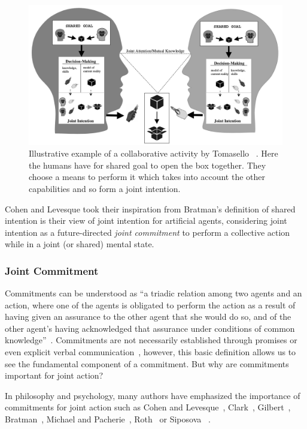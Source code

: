 \documentclass[a4paper,11pt,twoside]{StyleThese}
\begin{document}
 \begin{figure}[!ht]
 	\includegraphics[width=\linewidth]{figures/chapter1/shared_representation.png}
 	\caption{Illustrative example of a collaborative activity by Tomasello \etal~\cite{tomasello_2005_understanding}. Here the humans have for shared goal to open the box together. They choose a means to perform it which takes into account the other capabilities and so form a joint	intention.}
 	\label{chap1:fig:ji}
 \end{figure}

Cohen and Levesque took their inspiration from Bratman's definition of shared intention is their view of joint intention for artificial agents, considering joint intention as a future-directed \emph{joint commitment} to perform a collective action while in a joint (or shared) mental state.

\subsubsection{Joint Commitment}\label{chap1:subsubsec:joint_commit}
Commitments can be understood as ``a triadic relation among two agents and an action, where one of the agents is obligated to perform the action as a result of having given an assurance to the other agent that she would do so, and of the other agent’s having acknowledged that assurance under conditions of common knowledge''~\cite[p.~756]{michael_2017_commitment}. Commitments are not necessarily established through promises or even explicit verbal communication~\cite{ledyard_1994_public, scanlon_2000_we, siposova_2018_communicative}, however, this basic definition allows us to see the fundamental component of a commitment. But why are commitments important for joint action?

In philosophy and psychology, many authors have emphasized the importance of commitments for joint action such as Cohen and Levesque~\cite{cohen_1991_teamwork}, Clark~\cite{clark_2006_social}, Gilbert~\cite{gilbert_2009_shared}, Bratman~\cite{bratman_2014_shared}, Michael and Pacherie~\cite{michael_2015_commitments}, Roth~\cite{roth_2014_shared} or Siposova \etal~\cite{siposova_2018_communicative}. 
\end{document}
